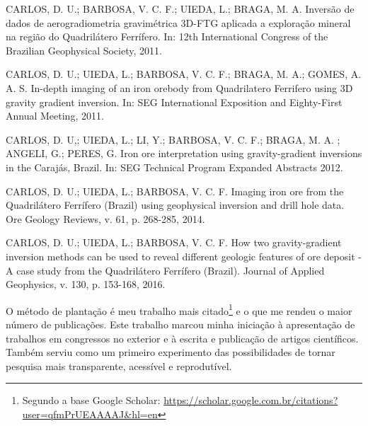 \begin{displayquote}
    CARLOS, D. U.; BARBOSA, V. C. F.; UIEDA, L.; BRAGA, M. A. Inversão de
    dados de aerogradiometria gravimétrica 3D-FTG aplicada a exploração mineral
    na região do Quadrilátero Ferrífero. In: 12th International Congress of the
    Brazilian Geophysical Society, 2011.
\end{displayquote}

\begin{displayquote}
    CARLOS, D. U.; UIEDA, L.; BARBOSA, V. C. F.; BRAGA,
    M. A.; GOMES, A. A. S. In-depth imaging of an iron
    orebody from Quadrilatero Ferrifero using 3D gravity gradient inversion.
    In: SEG International Exposition and Eighty-First Annual Meeting, 2011.
\end{displayquote}

\begin{displayquote}
    CARLOS, D. U,; UIEDA, L.; LI, Y.; BARBOSA, V.
    C. F.; BRAGA, M. A. ; ANGELI, G.; PERES, G. Iron ore
    interpretation using gravity-gradient inversions in the Carajás, Brazil.
    In: SEG Technical Program Expanded Abstracts 2012.
\end{displayquote}

\begin{displayquote}
    CARLOS, D. U.; UIEDA, L.; BARBOSA, V. C. F. Imaging
    iron ore from the Quadrilátero Ferrífero (Brazil) using geophysical
    inversion and drill hole data. Ore Geology Reviews, v. 61, p. 268-285,
    2014.
\end{displayquote}

\begin{displayquote}
    CARLOS, D. U.; UIEDA, L.; BARBOSA, V. C. F. How two
    gravity-gradient inversion methods can be used to reveal different geologic
    features of ore deposit - A case study from the Quadrilátero Ferrífero
    (Brazil). Journal of Applied Geophysics, v. 130, p. 153-168, 2016.
\end{displayquote}


O método de plantação \citep{seed} é meu trabalho mais citado\footnote{Segundo
a base Google Scholar:
\url{https://scholar.google.com.br/citations?user=qfmPrUEAAAAJ&hl=en}} e o que
me rendeu o maior número de publicações.
Este trabalho marcou minha iniciação
à apresentação de trabalhos em congressos no exterior e
à escrita e publicação de artigos científicos.
Também serviu como um primeiro experimento das possibilidades de tornar
pesquisa mais transparente, acessível e reprodutível.



